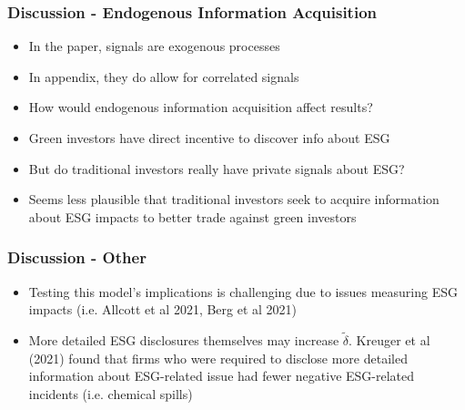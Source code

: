 \documentclass[handout]{beamer}
\begin{document}
\begin{frame}
\frametitle{Discussion - Endogenous Information Acquisition}
\begin{itemize}[<+->]
\item In the paper, signals are exogenous processes
\bigskip
\item In appendix, they do allow for correlated signals
\bigskip
\item How would endogenous information acquisition affect results?
\bigskip
\item Green investors have direct incentive to discover info about ESG
\bigskip
\item But do traditional investors really have private signals about ESG?
\bigskip
\item Seems less plausible that traditional investors seek to acquire information about ESG impacts to better trade against green investors
\end{itemize}
\end{frame}

\begin{frame}
\frametitle{Discussion - Other}
\begin{itemize}[<+->]
\item Testing this model's implications is challenging due to issues measuring ESG impacts (i.e. Allcott et al 2021, Berg et al 2021)
\bigskip
\item More detailed ESG disclosures themselves may increase $\tilde\delta$. Kreuger et al (2021) found that firms who were required to disclose more detailed information about ESG-related issue had fewer negative ESG-related incidents (i.e. chemical spills)
\end{itemize}
\end{frame}
\end{document}
